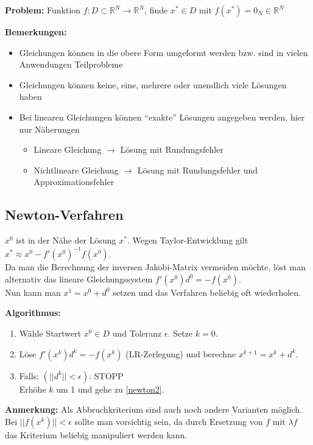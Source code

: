 \documentclass[a4paper]{article}
\begin{document}
\textbf{Problem:} Funktion $f: D \subset \mathbb{R}^N \to \mathbb{R}^N$, finde $x^*
\in D$ mit $f(x^*) = 0_N \in \mathbb{R}^N$

\textbf{Bemerkungen:}
\begin{itemize}
    \item Gleichungen können in die obere Form umgeformt werden bzw. sind in
    vielen Anwendungen Teilprobleme
    \item Gleichungen können keine, eine, mehrere oder unendlich viele Lösungen
    haben
    \item Bei linearen Gleichungen können \enquote{exakte} Lösungen angegeben
    werden, hier nur Näherungen
    \begin{itemize}
        \item Lineare Gleichung $\to$ Lösung mit Rundungsfehler
        \item Nichtlineare Gleichung $\to$ Lösung mit Rundungsfehler und
        Approximationsfehler
    \end{itemize}
\end{itemize}

\subsection{Newton-Verfahren}

$x^0$ ist in der Nähe der Lösung $x^*$. Wegen Taylor-Entwicklung gilt
$x^* \approx x^0 - f'(x^0)^{-1}f(x^0)$.
\\
Da man die Berechnung der inversen Jakobi-Matrix vermeiden möchte, löst man
alternativ das lineare Gleichungssystem $f'(x^0)d^0 = -f(x^0)$.
\\
Nun kann man $x^1 = x^0 + d^0$ setzen und das Verfahren beliebig oft
wiederholen.

\begin{samepage}
\textbf{Algorithmus:}
\begin{enumerate}
    \item Wähle Startwert $x^0 \in D$ und Toleranz $\epsilon$. Setze $k = 0$.
    \item\label{newton2} Löse $f'(x^k)d^k = -f(x^k)$ (LR-Zerlegung) und berechne
    $x^{k+1} = x^k + d^k$.
    \item Falls: $(||d^k|| < \epsilon)$: STOPP
          \\Erhöhe $k$ um 1 und gehe zu \ref{newton2}.
\end{enumerate}
\end{samepage}

\textbf{Anmerkung:} Als Abbruchkriterium sind auch noch andere Varianten
möglich. Bei $||f(x^k)|| < \epsilon$ sollte man vorsichtig sein, da durch
Ersetzung von $f$ mit $\lambda f$ das Kriterium beliebig manipuliert werden
kann.  
\end{document}
